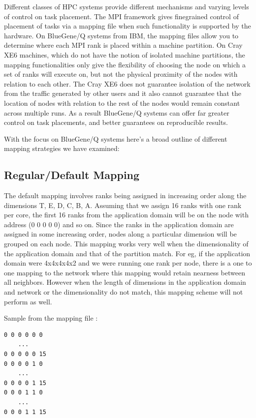 \documentclass{acm_proc_article-sp}
\begin{document}

Different classes of HPC systems provide different mechanisms and varying levels of control on task placement.
The MPI framework gives finegrained control of placement of tasks via a mapping file when such functionality
is supported by the hardware. On BlueGene/Q systems from IBM, the mapping files allow you to determine where
each MPI rank is placed within a machine partition. On Cray XE6 machines, which do not have the notion of
isolated machine partitions, the mapping functionalities only give the flexibility of choosing the node on
which a set of ranks will execute on, but not the physical proximity of the nodes with relation to each other.
The Cray XE6 does not guarantee isolation of the network from the traffic generated by other users and it
also cannot guarantee that the location of nodes with relation to the rest of the nodes would remain constant
across multiple runs. As a result BlueGene/Q systems can offer far greater control on task placements, and
better guarantees on reproducible results.

With the focus on BlueGene/Q systems here's a broad outline of different mapping strategies we have examined:

\subsection{Regular/Default Mapping}
The default mapping involves ranks being assigned in increasing order along the dimensions T, E, D, C, B, A.
Assuming that we assign 16 ranks with one rank per core, the first 16 ranks from the application domain will
be on the node with address (0 0 0 0 0) and so on. Since the ranks in the application domain are assigned in
some increasing order, nodes along a particular dimension will be grouped on each node. This mapping works
very well when the dimensionality of the application domain and that of the partition match. For eg, if the
application domain were 4x4x4x4x2 and we were running one rank per node, there is a one to one mapping to the
network where this mapping would retain nearness between all neighbors. However when the length of dimensions
in the application domain and network or the dimensionality do not match, this mapping scheme will not perform as well.

Sample from the mapping file :
\begin{lstlisting}
0 0 0 0 0 0
    ...
0 0 0 0 0 15
0 0 0 0 1 0
    ...
0 0 0 0 1 15
0 0 0 1 1 0
    ...
0 0 0 1 1 15
\end{lstlisting}
\end{document}
